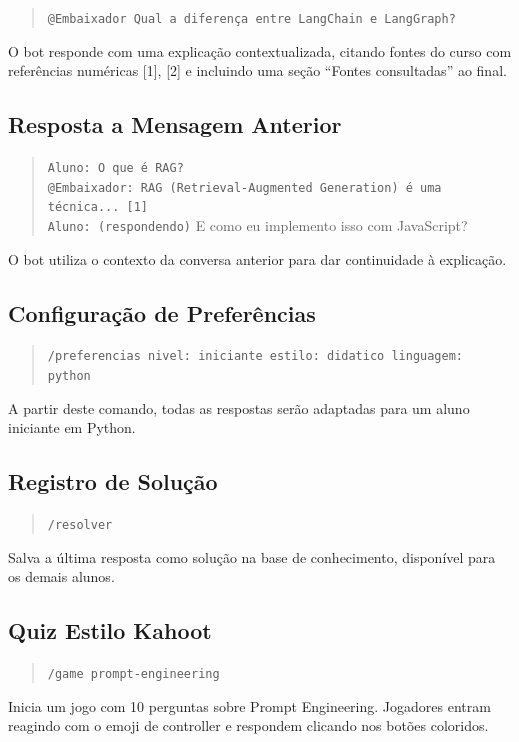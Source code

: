 \documentclass[11pt,a4paper]{article}
\begin{document}
\begin{quote}
\small\texttt{@Embaixador Qual a diferença entre LangChain e LangGraph?}
\end{quote}
O bot responde com uma explicação contextualizada, citando fontes do curso com referências numéricas [1], [2] e incluindo uma seção ``Fontes consultadas'' ao final.

\subsection{Resposta a Mensagem Anterior}

\begin{quote}
\small
\texttt{Aluno: O que é RAG?}\\
\texttt{@Embaixador: RAG (Retrieval-Augmented Generation) é uma técnica... [1]}\\
\texttt{Aluno: (respondendo)} E como eu implemento isso com JavaScript?
\end{quote}
O bot utiliza o contexto da conversa anterior para dar continuidade à explicação.

\subsection{Configuração de Preferências}

\begin{quote}
\small\texttt{/preferencias nivel: iniciante estilo: didatico linguagem: python}
\end{quote}
A partir deste comando, todas as respostas serão adaptadas para um aluno iniciante em Python.

\subsection{Registro de Solução}

\begin{quote}
\small\texttt{/resolver}
\end{quote}
Salva a última resposta como solução na base de conhecimento, disponível para os demais alunos.

\subsection{Quiz Estilo Kahoot}

\begin{quote}
\small\texttt{/game prompt-engineering}
\end{quote}
Inicia um jogo com 10 perguntas sobre Prompt Engineering. Jogadores entram reagindo com o emoji de controller e respondem clicando nos bot\~oes coloridos.
\end{document}
